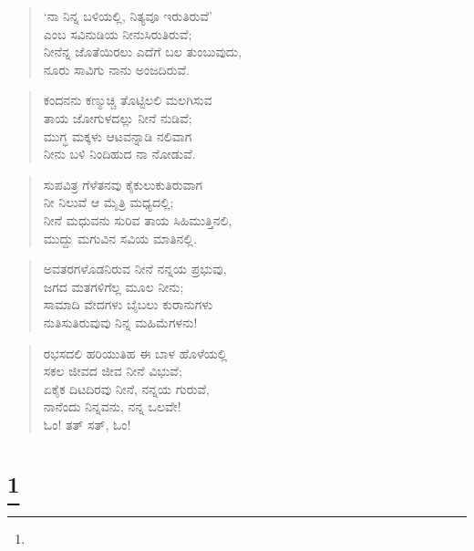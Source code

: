 \begin{verse}
‘ನಾ ನಿನ್ನ ಬಳಿಯಲ್ಲಿ, ನಿತ್ಯವೂ ಇರುತಿರುವೆ’\\ಎಂಬ ಸವಿನುಡಿಯ ನೀನುಸಿರುತಿರುವೆ;\\ನೀನೆನ್ನ ಜೊತೆಯಿರಲು ಎದೆಗೆ ಬಲ ತುಂಬುವುದು,\\ನೂರು ಸಾವಿಗು ನಾನು ಅಂಜದಿರುವೆ.
\end{verse}

\begin{verse}
ಕಂದನನು ಕಣ್ಮುಚ್ಚಿ ತೊಟ್ಟಿಲಲಿ ಮಲಗಿಸುವ\\ತಾಯ ಜೋಗುಳದಲ್ಲು ನೀನೆ ನುಡಿವೆ; \\ಮುಗ್ಧ ಮಕ್ಕಳು ಆಟವನ್ನಾಡಿ ನಲಿವಾಗ\\ನೀನು ಬಳಿ ನಿಂದಿಹುದ ನಾ ನೋಡುವೆ.
\end{verse}

\begin{verse}
ಸುಪವಿತ್ರ ಗೆಳೆತನವು ಕೈಕುಲುಕುತಿರುವಾಗ\\ನೀ ನಿಲುವೆ ಆ ಮೈತ್ರಿ ಮಧ್ಯದಲ್ಲಿ;\\ನೀನೆ ಮಧುವನು ಸುರಿವ ತಾಯ ಸಿಹಿಮುತ್ತಿನಲಿ,\\ಮುದ್ದು ಮಗುವಿನ ಸವಿಯ ಮಾತಿನಲ್ಲಿ.
\end{verse}

\begin{verse}
ಅವತರಗಳೊಡನಿರುವ ನೀನೆ ನನ್ನಯ ಪ್ರಭುವು,\\ಜಗದ ಮತಗಳಿಗೆಲ್ಲ ಮೂಲ ನೀನು;\\ಸಾಮಾದಿ ವೇದಗಳು ಬೈಬಲು ಕುರಾನುಗಳು\\ನುತಿಸುತಿರುವುವು ನಿನ್ನ ಮಹಿಮೆಗಳನು! 
\end{verse}

\begin{verse}
ರಭಸದಲಿ ಹರಿಯುತಿಹ ಈ ಬಾಳ ಹೊಳೆಯಲ್ಲಿ\\ಸಕಲ ಜೀವದ ಜೀವ ನೀನೆ ವಿಭುವೆ;\\ಏಕೈಕ ದಿಟದಿರವು ನೀನೆ, ನನ್ನಯ ಗುರುವೆ,\\ನಾನೆಂದು ನಿನ್ನವನು, ನನ್ನ ಒಲವೇ!\\ಓಂ! ತತ್ ಸತ್, ಓಂ!
\end{verse}

\selecteng

\chapter[THE SONG OF THE SANNYASIN]{\protect\footnote{}}

\begin{verse}
\end{verse}

